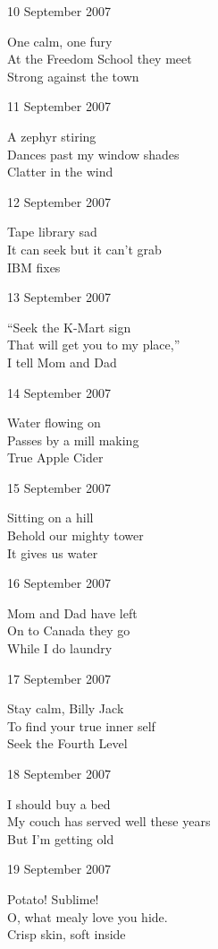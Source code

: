 \documentclass[12pt]{article}
\begin{document}
\newpage

10 September 2007

One calm, one fury \\
At the Freedom School they meet \\
Strong against the town

11 September 2007

A zephyr stiring \\
Dances past my window shades \\
Clatter in the wind

12 September 2007

Tape library sad \\
It can seek but it can't grab \\
IBM fixes

13 September 2007

``Seek the K-Mart sign \\
That will get you to my place,'' \\
I tell Mom and Dad

14 September 2007

Water flowing on \\
Passes by a mill making \\
True Apple Cider

15 September 2007

Sitting on a hill \\
Behold our mighty tower \\
It gives us water

16 September 2007

Mom and Dad have left \\
On to Canada they go \\
While I do laundry



\newpage

17 September 2007

Stay calm, Billy Jack \\
To find your true inner self \\
Seek the Fourth Level

18 September 2007

I should buy a bed \\
My couch has served well these years \\
But I'm getting old

19 September 2007

Potato! Sublime! \\
O, what mealy love you hide. \\
Crisp skin, soft inside
\end{document}
